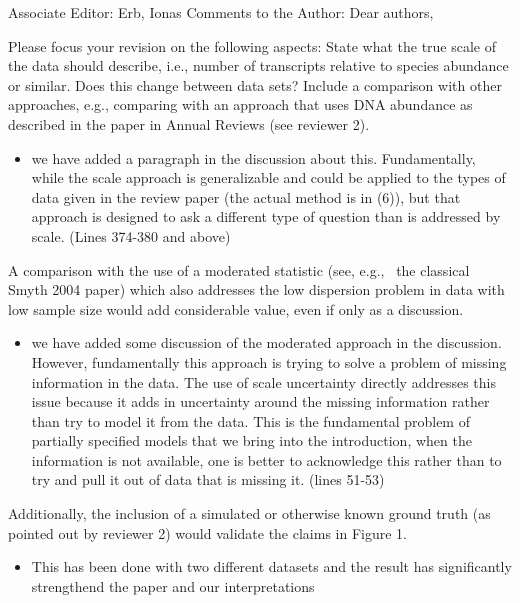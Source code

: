 \documentclass[
]{article}
\providecommand{\tightlist}{%
  \setlength{\itemsep}{0pt}\setlength{\parskip}{0pt}}
\begin{document}
Associate Editor: Erb, Ionas Comments to the Author: Dear authors,

Please focus your revision on the following aspects: State what the true
scale of the data should describe, i.e., number of transcripts relative
to species abundance or similar. Does this change between data sets?
Include a comparison with other approaches, e.g., comparing with an
approach that uses DNA abundance as described in the paper in Annual
Reviews (see reviewer 2).

\begin{itemize}
\tightlist
\item
  we have added a paragraph in the discussion about this. Fundamentally,
  while the scale approach is generalizable and could be applied to the
  types of data given in the review paper (the actual method is in (6)),
  but that approach is designed to ask a different type of question than
  is addressed by scale. (Lines 374-380 and above)
\end{itemize}

A comparison with the use of a moderated statistic (see, e.g., ~the
classical Smyth 2004 paper) which also addresses the low dispersion
problem in data with low sample size would add considerable value, even
if only as a discussion.

\begin{itemize}
\tightlist
\item
  we have added some discussion of the moderated approach in the
  discussion. However, fundamentally this approach is trying to solve a
  problem of missing information in the data. The use of scale
  uncertainty directly addresses this issue because it adds in
  uncertainty around the missing information rather than try to model it
  from the data. This is the fundamental problem of partially specified
  models that we bring into the introduction, when the information is
  not available, one is better to acknowledge this rather than to try
  and pull it out of data that is missing it. (lines 51-53)
\end{itemize}

Additionally, the inclusion of a simulated or otherwise known ground
truth (as pointed out by reviewer 2) would validate the claims in Figure
1.

\begin{itemize}
\tightlist
\item
  This has been done with two different datasets and the result has
  significantly strengthend the paper and our interpretations
\end{itemize}
\end{document}
